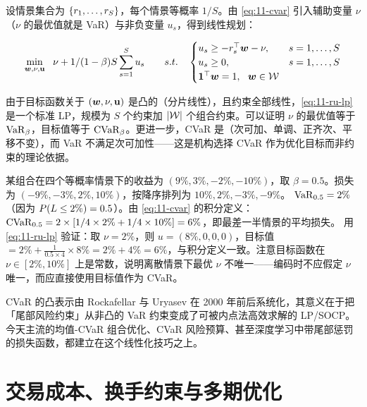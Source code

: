设情景集合为 $\{r_1,\dots,r_S\}$，每个情景等概率 $1/S$。由 \cref{eq:11-cvar} 引入辅助变量 $\nu$（$\nu$ 的最优值就是 VaR）与非负变量 $u_s$，得到线性规划：

\begin{equation}\label{eq:11-ru-lp}
  \min_{\bm{w},\nu,\mathbf{u}}\ \ \nu + 1/(1-\beta)S\sum_{s=1}^{S}u_s
  \qquad
  s.t.\quad
  \begin{cases}
    u_s \ge -r_s^{\top}\bm{w} - \nu, & s = 1,\dots,S\\
    u_s \ge 0, & s = 1,\dots,S\\
    \mathbf{1}^{\top}\bm{w} = 1,\ \ \bm{w} \in \mathcal{W}
  \end{cases}
\end{equation}

由于目标函数关于 $(\bm{w},\nu,\mathbf{u})$ 是凸的（分片线性），且约束全部线性，\cref{eq:11-ru-lp} 是一个标准 LP，规模为 $S$ 个约束加 $\left\lvert \mathcal{W} \right\rvert$ 个组合约束。可以证明 $\nu$ 的最优值等于 $\operatorname{VaR}_\beta$，目标值等于 $\operatorname{CVaR}_\beta$。更进一步，CVaR 是（次可加、单调、正齐次、平移不变），而 VaR 不满足次可加性——这是机构选择 CVaR 作为优化目标而非约束的理论依据。

\begin{example}\label{ex:11-cvar}
某组合在四个等概率情景下的收益为 $(9\%,3\%,-2\%,-10\%)$，取 $\beta = 0.5$。损失为 $(-9\%,-3\%,2\%,10\%)$，按降序排列为 $10\%,2\%,-3\%,-9\%$。
$\operatorname{VaR}_{0.5} = 2\%$（因为 $P(L\le 2\%) = 0.5$）。由 \cref{eq:11-cvar} 的积分定义：$\operatorname{CVaR}_{0.5} = 2\times\left[1/4\times 2\% + 1/4\times 10\%\right] = 6\%$，即最差一半情景的平均损失。
用 \cref{eq:11-ru-lp} 验证：取 $\nu = 2\%$，则 $u = (8\%,0,0,0)$，目标值 $= 2\% + \frac{1}{0.5\times 4}\times 8\% = 2\% + 4\% = 6\%$，与积分定义一致。注意目标函数在 $\nu\in[2\%,10\%]$ 上是常数，说明离散情景下最优 $\nu$ 不唯一——编码时不应假定 $\nu$ 唯一，而应直接使用目标值作为 CVaR。
\end{example}

\begin{notebox}
CVaR 的凸表示由 Rockafellar 与 Uryasev 在 2000 年前后系统化，其意义在于把「尾部风险约束」从非凸的 VaR 约束变成了可被内点法高效求解的 LP/SOCP。今天主流的均值-CVaR 组合优化、CVaR 风险预算、甚至深度学习中带尾部惩罚的损失函数，都建立在这个线性化技巧之上。
\end{notebox}

\section{交易成本、换手约束与多期优化}

